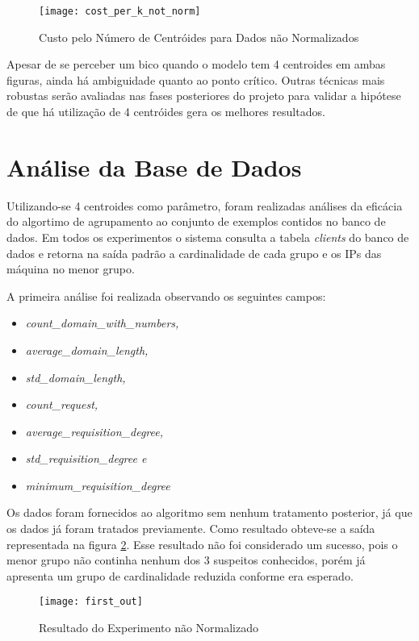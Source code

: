 \begin{figure}[htbp]
\centering
\texttt{[image: cost\_per\_k\_not\_norm]}
\caption[Custo pelo Número de Centróides para Dados não Normalizados]{Custo pelo Número de Centróides para Dados não Normalizados} \label{fig:cost_per_k_not_norm}
\end{figure}

Apesar de se perceber um bico quando o modelo tem 4 centroides em ambas figuras, ainda há ambiguidade quanto ao ponto crítico. Outras técnicas mais robustas serão avaliadas nas fases posteriores do projeto para validar a hipótese de que há utilização de 4 centróides gera os melhores resultados.

\section{Análise da Base de Dados}

Utilizando-se 4 centroides como parâmetro, foram realizadas análises da eficácia do algortimo de agrupamento ao conjunto de exemplos contidos no banco de dados. Em todos os experimentos o sistema consulta a tabela \textit{clients} do banco de dados e retorna na saída padrão a cardinalidade de cada grupo e os IPs das máquina no menor grupo.

A primeira análise foi realizada observando os seguintes campos:

\begin{itemize}
\item \textit{count\_domain\_with\_numbers, }
\item \textit{average\_domain\_length, }
\item \textit{std\_domain\_length, }
\item \textit{count\_request, }
\item \textit{average\_requisition\_degree, }
\item \textit{std\_requisition\_degree e }
\item \textit{minimum\_requisition\_degree }
\end{itemize}

Os dados foram fornecidos ao algoritmo sem nenhum tratamento posterior, já que os dados já foram tratados previamente. Como resultado obteve-se a saída representada na figura \ref{fig:first_out}. Esse resultado não foi considerado um sucesso, pois o menor grupo não continha nenhum dos 3 suspeitos conhecidos, porém já apresenta um grupo de cardinalidade reduzida conforme era esperado.

\begin{figure}[htbp]
\centering
\texttt{[image: first\_out]}
\caption[Resultado do Experimento não Normalizado]{Resultado do Experimento não Normalizado} \label{fig:first_out}
\end{figure}

